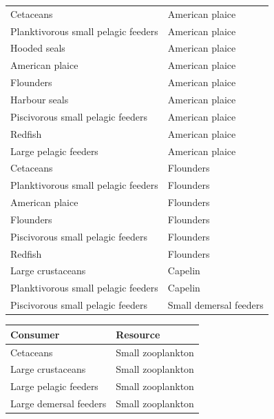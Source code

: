 \begin{singlespace}
\begin{table}[h!]
\begin{tabular}{|l|l|}
      Cetaceans                           & American plaice   \\
      Planktivorous small pelagic feeders & American plaice   \\
      Hooded seals                        & American plaice   \\
      American plaice                     & American plaice   \\
      Flounders                           & American plaice   \\
      Harbour seals                       & American plaice   \\
      Piscivorous small pelagic feeders   & American plaice   \\
      Redfish                             & American plaice   \\
      Large pelagic feeders               & American plaice   \\
      Cetaceans                           & Flounders \\
      Planktivorous small pelagic feeders & Flounders \\
      American plaice                     & Flounders \\
      Flounders                           & Flounders \\
      Piscivorous small pelagic feeders   & Flounders \\
      Redfish                             & Flounders \\
      Large crustaceans                   & Capelin   \\
      Planktivorous small pelagic feeders & Capelin   \\
      Piscivorous small pelagic feeders   & Small demersal feeders    \\
      \hline
  \end{tabular}
\end{table}
\newpage
\begin{table}[h!]
  \centering
  \begin{tabular}{|l|l|}
      \hline
      Consumer               & Resource \\
      \hline    \hline
      Cetaceans                           & Small zooplankton \\
      Large crustaceans                   & Small zooplankton \\
      Large pelagic feeders               & Small zooplankton \\
      Large demersal feeders              & Small zooplankton \\

\end{tabular}
\end{table}
\end{singlespace}
